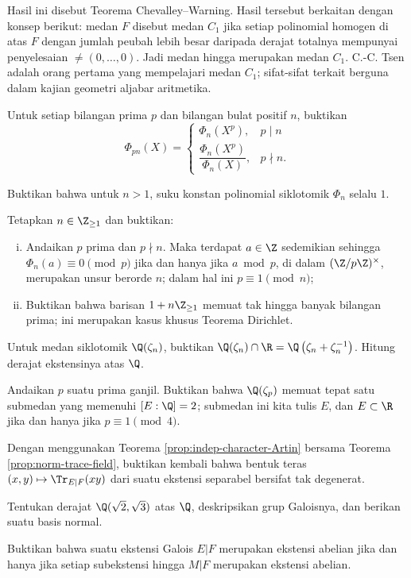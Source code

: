 \begin{Exercises}
\begin{compactenum}[(i)]
		\end{compactenum}
		Hasil ini disebut Teorema Chevalley--Warning. Hasil tersebut berkaitan dengan konsep berikut: medan $F$ disebut medan $C_1$ jika setiap polinomial homogen di atas $F$ dengan jumlah peubah lebih besar daripada derajat totalnya mempunyai penyelesaian $\neq (0, \ldots, 0)$. Jadi medan hingga merupakan medan $C_1$. C.-C. Tsen adalah orang pertama yang mempelajari medan $C_1$; sifat-sifat terkait berguna dalam kajian geometri aljabar aritmetika.
	\item Untuk setiap bilangan prima $p$ dan bilangan bulat positif $n$, buktikan
		\[ \Phi_{pn}(X) = \begin{cases} \Phi_n(X^p), & p \mid n \\ \dfrac{\Phi_n(X^p)}{\Phi_n(X)}, & p \nmid n. \end{cases} \]
	\item Buktikan bahwa untuk $n > 1$, suku konstan polinomial siklotomik $\Phi_n$ selalu $1$.
	\item Tetapkan $n \in \Z_{\geq 1}$ dan buktikan:
		\begin{enumerate}[(i)]
			\item Andaikan $p$ prima dan $p \nmid n$. Maka terdapat $a \in \Z$ sedemikian sehingga $\Phi_n(a) \equiv 0 \pmod p$ jika dan hanya jika $a \bmod p$, di dalam $(\Z/p\Z)^\times$, merupakan unsur berorde $n$; dalam hal ini $p \equiv 1 \pmod n$;
			\item Buktikan bahwa barisan $1 + n\Z_{\geq 1}$ memuat tak hingga banyak bilangan prima; ini merupakan kasus khusus Teorema Dirichlet.
		\end{enumerate}
	\item Untuk medan siklotomik $\Q(\zeta_n)$, buktikan $\Q(\zeta_n) \cap \R = \Q\left( \zeta_n + \zeta_n^{-1} \right)$. Hitung derajat ekstensinya atas $\Q$.
	\item Andaikan $p$ suatu prima ganjil. Buktikan bahwa $\Q(\zeta_p)$ memuat tepat satu submedan yang memenuhi $[E:\Q]=2$; submedan ini kita tulis $E$, dan $E \subset \R$ jika dan hanya jika $p \equiv 1 \pmod{4}$.
	\item Dengan menggunakan Teorema \ref{prop:indep-character-Artin} bersama Teorema \ref{prop:norm-trace-field}, buktikan kembali bahwa bentuk teras $(x,y) \mapsto \Tr_{E|F}(xy)$ dari suatu ekstensi separabel bersifat tak degenerat.
	\item Tentukan derajat $\Q(\sqrt{2},\sqrt{3})$ atas $\Q$, deskripsikan grup Galoisnya, dan berikan suatu basis normal.
	\item Buktikan bahwa suatu ekstensi Galois $E|F$ merupakan ekstensi abelian jika dan hanya jika setiap subekstensi hingga $M|F$ merupakan ekstensi abelian.

\end{Exercises}
